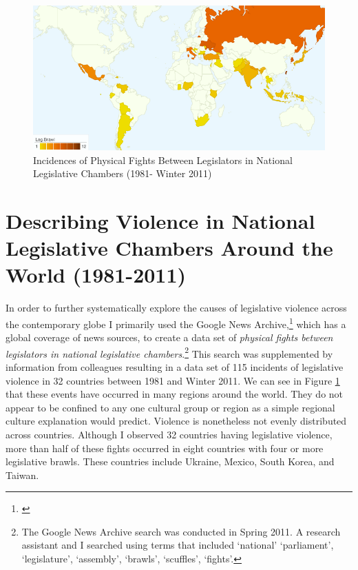 \documentclass[a4paper]{article}\usepackage[]{graphicx}\usepackage[]{color}
\begin{document}
\begin{figure}[h!]
    \centering
    \caption{Incidences of Physical Fights Between Legislators in National Legislative Chambers (1981- Winter 2011)}
    \label{leg_map}
        \includegraphics[width = 13cm]{incidence_map.png}
\end{figure}

\section{Describing Violence in National Legislative Chambers Around the World (1981-2011)}

In order to further systematically explore the causes of legislative violence across the contemporary globe I primarily used the Google News Archive,\footnote{\citealt{GoogleNews2011}} which has a global coverage of news sources, to create a data set of {\emph{physical fights between legislators in national legislative chambers}}.\footnote{The Google News Archive search was conducted in Spring 2011. A research assistant and I searched using terms that included `national' `parliament', `legislature', `assembly', `brawls', `scuffles', `fights'.} This search was supplemented by information from colleagues resulting in a data set of 115 incidents of legislative violence in 32 countries between 1981 and Winter 2011. We can see in Figure \ref{leg_map} that these events have occurred in many regions around the world. They do not appear to be confined to any one cultural group or region as a simple regional culture explanation would predict. Violence is nonetheless not evenly distributed across countries. Although I observed 32 countries having legislative violence, more than half of these fights occurred in eight countries with four or more legislative brawls. These countries include Ukraine, Mexico, South Korea, and Taiwan. 
\end{document}
